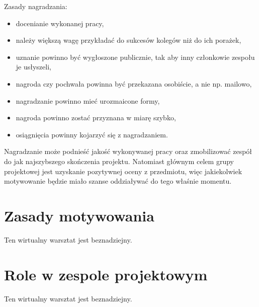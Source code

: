 Zasady nagradzania:

\begin{itemize}
\item docenianie wykonanej pracy,
\item należy większą wagę przykładać do sukcesów kolegów niż do ich porażek,
\item uznanie powinno być wygłoszone publicznie, tak aby inny członkowie zespołu je usłyszeli,
\item nagroda czy pochwała powinna być przekazana osobiście, a nie np. mailowo,
\item nagradzanie powinno mieć urozmaicone formy,
\item nagroda powinno zostać przyznana w miarę szybko,
\item osiągnięcia powinny kojarzyć się z nagradzaniem.
\end{itemize}
Nagradzanie może podnieść jakość wykonywanej pracy oraz zmobilizować zespół do jak najszybszego skończenia projektu. Natomiast głównym celem grupy projektowej jest uzyskanie pozytywnej oceny 
z przedmiotu, więc jakiekolwiek motywowanie będzie miało szanse oddziaływać do tego właśnie momentu.



\section{Zasady motywowania}

Ten wirtualny warsztat jest beznadziejny.


\section{Role w zespole projektowym}

Ten wirtualny warsztat jest beznadziejny.


